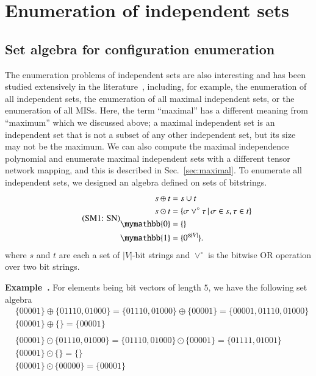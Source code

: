 \documentclass[onefignum, onetabnum]{siamart190516}
\newcommand{\eqname}[1]{\stepcounter{equation}\tag{\theequation : #1}}
\newcommand{\<}{\langle}
\renewcommand{\>}{\rangle}
\newcommand{\Sec}[1]{Sec.~\ref{#1}}
\newcounter{example}
\newenvironment{example}[1][]{\refstepcounter{example}\par\medskip
   \noindent \textbf{Example~\theexample. #1} \rmfamily}{\medskip}
\begin{document}
\section{Enumeration of independent sets}
\subsection{Set algebra for configuration enumeration}
The enumeration problems of independent sets are also interesting and has been studied extensively in the literature~\cite{Bron1973, Eppstein2010, Johnson1988}, including,
for example, the enumeration of all independent sets, the enumeration of all maximal independent sets, or the enumeration of all MISs.
Here, the term ``maximal'' has a different meaning from ``maximum''  which we discussed above;
a maximal independent set is an independent set that is not a subset of any other independent set, but its size may not be the maximum.
We can also compute the maximal independence polynomial and enumerate maximal independent sets with a different tensor network mapping, and this is described in \Sec{sec:maximal}.
To enumerate all independent sets, we designed an algebra defined on sets of bitstrings.
\begin{equation}
\eqname{SN}
\begin{split}
    s \oplus t &= s \cup t\\
    s \odot t &= \{\sigma \lor^\circ \tau \, | \, \sigma \in s, \tau \in t\}\\
    \mymathbb{0} &= \{\}\\
    \mymathbb{1} &= \{0^{\otimes |V|}\}.
\end{split}\label{eq:set}
\end{equation}
where $s$ and $t$ are each a set of $|V|$-bit strings and $\lor^\circ$ is the bitwise OR operation over two bit strings.
\begin{example}\label{eg:setalgebra}
    For elements being bit vectors of length $5$, we have the following set algebra
\begin{equation*}
\begin{split}
    &\{00001\} \oplus \{01110, 01000\} = \{01110, 01000\} \oplus \{00001\} = \{00001,01110, 01000\}\\
    &\{00001\} \oplus \{\} = \{00001\}\\
&\\
    &\{00001\} \odot \{01110, 01000\} = \{01110, 01000\} \odot \{00001\} = \{01111, 01001\}\\
    &\{00001\} \odot \{\} = \{\}\\
    &\{00001\} \odot \{00000\} = \{00001\}
\end{split}
\end{equation*}
\end{example}
\end{document}

